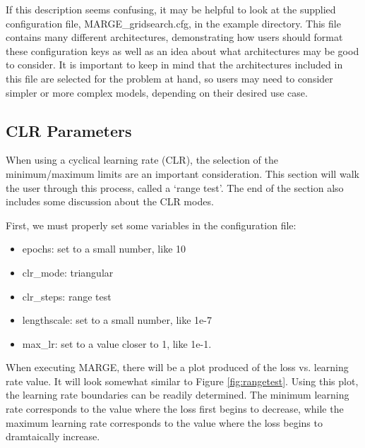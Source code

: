 \documentclass[letterpaper, 12pt]{article}
\begin{document}
\noindent If this description seems confusing, it may be helpful to look at 
the supplied configuration file, MARGE\_gridsearch.cfg, in the example directory.
This file contains many different architectures, demonstrating how users 
should format these configuration keys as well as an idea about what 
architectures may be good to consider.  It is important to keep in mind that 
the architectures included in this file are selected for the problem at hand, 
so users may need to consider simpler or more complex models, depending on 
their desired use case.


\subsection{CLR Parameters}

When using a cyclical learning rate (CLR), the selection of the minimum/maximum 
limits are an important consideration.  This section will walk the user through 
this process, called a `range test'.  The end of the section also includes some 
discussion about the CLR modes.  \newline

\noindent First, we must properly set some variables in the configuration file:
\begin{itemize}
\item epochs: set to a small number, like 10
\item clr\_mode: triangular
\item clr\_steps: range test
\item lengthscale: set to a small number, like 1e-7
\item max\_lr: set to a value closer to 1, like 1e-1.
\end{itemize}

\noindent When executing MARGE, there will be a plot produced of the loss vs. 
learning rate value.  It will look somewhat similar to Figure 
\ref{fig:rangetest}.  Using this plot, the learning rate boundaries can be 
readily determined.  The minimum learning rate corresponds to the value where 
the loss first begins to decrease, while the maximum learning rate corresponds 
to the value where the loss begins to dramtaically increase.\newline
\end{document}
